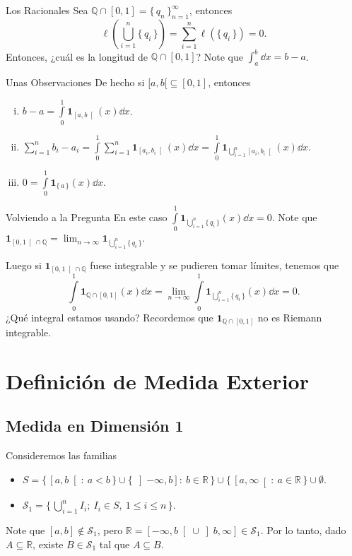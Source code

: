 \documentclass[utf8]{beamer}
\theoremstyle{plain}
\theoremstyle{definition}
\theoremstyle{remark}
\numberwithin{equation}{section}
\newcommand{\bQ}{\mathbb{Q}}    %
\newcommand{\bR}{\mathbb{R}}    %
\newcommand{\cS}{\mathcal{S}}           %
\newcommand{\bonj}[1]{\left\lbrack#1\right\rbrack}
\newcommand{\rbonj}[1]{\left\rbrack#1\right\rbrack}
\newcommand{\lbonj}[1]{\left\lbrack#1\right\lbrack}
\newcommand{\set}[1]{\{\,#1\,\}}    %
\newcommand{\Set}[1]{\biggl\{\,#1\,\biggr\}} %
\renewcommand{\l}{\ell}                   %
\renewcommand{\leq}{\leqslant}          %
\newcommand{\ind}{\mathbf{1}}       %
\newcommand{\sucn}{_{n=1}^\infty} %
\renewcommand{\.}{\Cdot}                %
\begin{document}
\begin{frame}{Los Racionales}
  Sea $\bQ\cap[0,1]=\set{q_n}\sucn$, entonces
  $$\l\left(\bigcup_{i=1}^n\set{q_i}\right)=\sum_{i=1}^n\l(\set{q_i})=0.$$
  Entonces, ¿cuál es la longitud de $\bQ\cap[0,1]$? Note que $\displaystyle\int_a^b\dd x=b-a$. 
\end{frame}

\begin{frame}{Unas Observaciones}
  De hecho si $[a,b[\subseteq[0,1]$, entonces
  \begin{enumerate}[(i)]
    \item $\displaystyle b-a=\int\limits_0^1\ind_{\lbonj{a,b}}(x)\dd x$.
    \item $\displaystyle \sum_{i=1}^nb_i-a_i=\int\limits_0^1\sum_{i=1}^n\ind_{\lbonj{a_i,b_i}}(x)\dd x=\int\limits_0^1\ind_{\bigcup_{i=1}^n\lbonj{a_i,b_i}}(x)\dd x$.
    \item $\displaystyle 0=\int\limits_0^1\ind_{\set{a}}(x)\dd x$.
  \end{enumerate}
\end{frame}

\begin{frame}{Volviendo a la Pregunta}
  En este caso $\displaystyle\int\limits_0^1\ind_{\bigcup_{i=1}^n\set{q_i}}(x)\dd x=0$. Note que $\ind_{\lbonj{0,1}\cap\bQ}=\lim_{n\to\infty}\ind_{\bigcup_{i=1}^n\set{q_i}}$.\par 
  Luego si $\ind_{\lbonj{0,1}\cap\bQ}$ fuese integrable y se pudieren tomar límites, tenemos que 
  $$\int\limits_0^1\ind_{\bQ\cap\bonj{0,1}}(x)\dd x=\lim_{n\to\infty}\int\limits_0^1\ind_{\bigcup_{i=1}^n\set{q_i}}(x)\dd x=0.$$
  ¿Qué integral estamos usando? Recordemos que $\ind_{\bQ\cap\bonj{0,1}}$ no es Riemann integrable.
\end{frame}

\section{Definición de Medida Exterior}

\subsection{Medida en Dimensión 1}
\begin{frame}
  Consideremos las familias
  \begin{itemize}
    \item $\displaystyle S=\set{\lbonj{a,b}:\ a<b}\cup\set{\rbonj{-\infty,b}:\ b\in\bR}\cup\set{\lbonj{a,\infty}:\ a\in\bR}\cup \emptyset$.
    \item $\displaystyle\cS_1=\Set{\bigcup_{i=1}^n I_i;\ I_i\in S,\ 1\leq i\leq n}$.
  \end{itemize}
Note que $[a,b]\not\in\cS_1$, pero $\bR=\lbonj{-\infty,b}\cup\rbonj{b,\infty}\in\cS_1$. Por lo tanto, dado $A\subseteq\bR$, existe $B\in\cS_1$ tal que $A\subseteq B$.
\end{frame}
\end{document}

